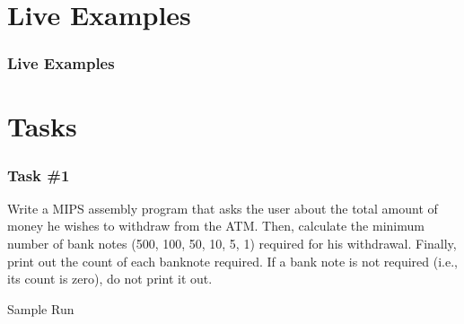 \documentclass[
	10pt, %
	hmargin=1cm,vmargin=0cm,head=0.5cm,headsep=0pt,foot=0.5cm,margin=2cm
]{beamer}
\begin{document}
\section{Live Examples}
\begin{frame}
	\frametitle{Live Examples}
	
\end{frame}


\section{Tasks}

\begin{frame}
	\frametitle{Task \#1}
	\justifying
	Write a MIPS assembly program that asks the user about the total amount of money he wishes to withdraw from the ATM. 
	Then, calculate the minimum number of bank notes (500, 100, 50, 10, 5, 1) required for his withdrawal. 
	Finally, print out the count of each banknote required. If a bank note is not required (i.e., its count is zero), do not print it out. 

	\vspace{0.3cm}
	\centering
	Sample Run

\end{frame}
\end{document}
